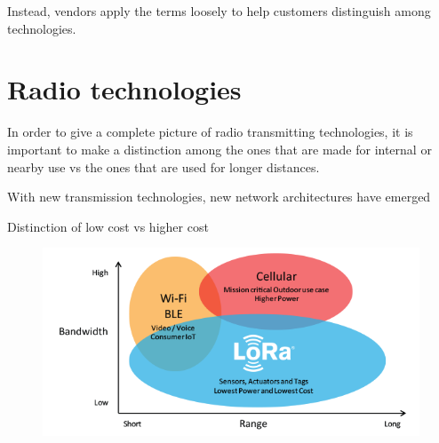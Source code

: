 Instead, vendors apply the terms loosely to help customers distinguish among technologies.

\section{Radio technologies}\label{sec:section_two}

In order to give a complete picture of radio transmitting technologies, it is important to make a distinction among the ones that are made for internal or nearby use vs the ones that are used for longer distances.


With new transmission technologies, new network architectures have emerged


Distinction of low cost vs higher cost

\begin{figure}
	\centering
	\includegraphics[width=\textwidth]{resources/img/LoRa_Why_Range}
	\caption{}
\end{figure}

